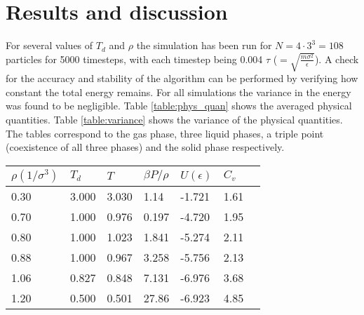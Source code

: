 \section{Results and discussion}
For several values of $T_d$ and $\rho$ the simulation has been run for $N = 4 \cdot 3^3 = 108$ particles for 5000 timesteps, with each timestep being 0.004 $\tau$ ($=\sqrt{\frac{m\sigma^2}{\epsilon}}$). A check for the accuracy and stability of the algorithm can be performed by verifying how constant the total energy remains. For all simulations the variance in the energy was found to be negligible.
Table \ref{table:phys_quan} shows the averaged physical quantities. Table \ref{table:variance} shows the variance of the physical quantities. The tables correspond to the gas phase, three liquid phases, a triple point (coexistence of all three phases) and the solid phase respectively.
\begin{center}
\centerfloat
{}
\begin{tabular}{lllllll}
\hline \hline
$\rho(1/\sigma^3)$ & $T_d$ & $T$ & $\beta P/\rho$ & $U(\epsilon)$ & $C_v$\\
\hline
0.30 & 3.000 & 3.030 & 1.14 & -1.721 & 1.61\\
0.70 & 1.000 & 0.976 & 0.197 & -4.720 & 1.95\\
0.80 & 1.000 & 1.023 & 1.841 & -5.274 & 2.11\\
0.88& 1.000 & 0.967 & 3.258 & -5.756 & 2.13\\
1.06& 0.827&0.848 & 7.131 & -6.976 & 3.68\\
1.20 & 0.500 & 0.501 & 27.86 & -6.923 & 4.85\\
\hline \hline
\end{tabular}
\vspace{-0.1cm}
\label{table:phys_quan}
\end{center}


